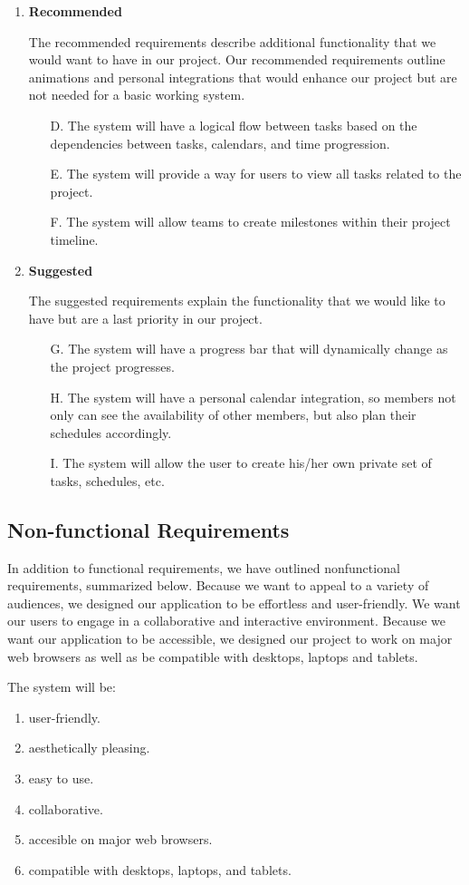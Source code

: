 \begin{enumerate}
\begin{enumerate}
	\end{enumerate}
\item \textbf{Recommended}
\par The recommended requirements describe additional functionality that we would want to have in our project. Our recommended requirements outline animations and personal integrations that would enhance our project but are not needed for a basic working system. 
	\begin{enumerate}
	\item[D.] The system will have a logical flow between tasks based on the dependencies between tasks, calendars, and time progression. 
	\item[E.] The system will provide a way for users to view all tasks related to the project.
	\item[F.] The system will allow teams to create milestones within their project timeline.
	\end{enumerate}
\item \textbf{Suggested}
\par The suggested requirements explain the functionality that we would like to have but are a last priority in our project. 
	\begin{enumerate}
	\item[G.] The system will have a progress bar that will dynamically change as the project progresses.
	\item[H.] The system will have a personal calendar integration, so members not only can see the availability of other members, but also plan their schedules accordingly.
	\item[I.] The system will allow the user to create his/her own private set of tasks, schedules, etc.
	\end{enumerate}
\end{enumerate}
\subsection{Non-functional Requirements}
In addition to functional requirements, we have outlined nonfunctional requirements, summarized below. Because we want to appeal to a variety of audiences, we designed our application to be effortless and user-friendly. We want our users to engage in a collaborative and interactive environment. Because we want our application to be accessible, we designed our project to work on major web browsers as well as be compatible with desktops, laptops and tablets.
\par The system will be:
\begin{enumerate}
\item user-friendly.
\item aesthetically pleasing.
\item easy to use.
\item collaborative.
\item accesible on major web browsers. 
\item compatible with desktops, laptops, and tablets. 
\end{enumerate}
